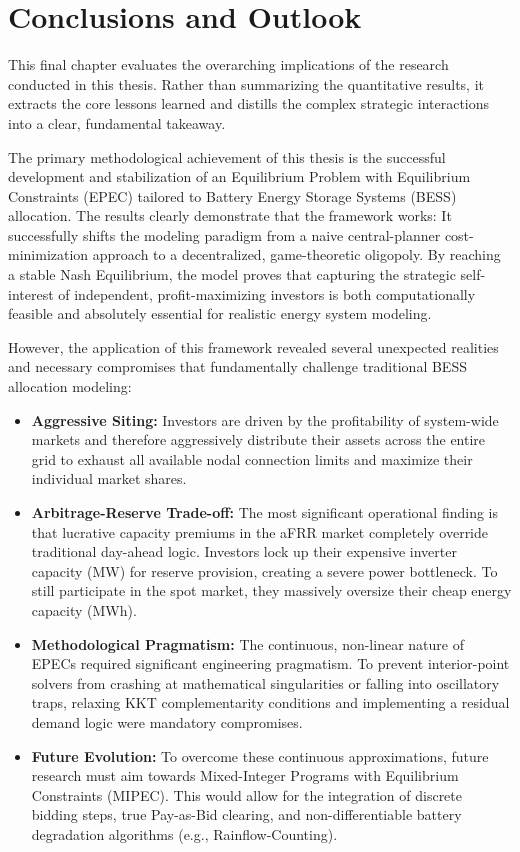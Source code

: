 \chapter{Conclusions and Outlook} \label{ch:conclusion}

This final chapter evaluates the overarching implications of the research conducted in this thesis. Rather than summarizing the quantitative results, it extracts the core lessons learned and distills the complex strategic interactions into a clear, fundamental takeaway.

The primary methodological achievement of this thesis is the successful development and stabilization of an Equilibrium Problem with Equilibrium Constraints (EPEC) tailored to Battery Energy Storage Systems (BESS) allocation. The results clearly demonstrate that the framework works: It successfully shifts the modeling paradigm from a naive central-planner cost-minimization approach to a decentralized, game-theoretic oligopoly. By reaching a stable Nash Equilibrium, the model proves that capturing the strategic self-interest of independent, profit-maximizing investors is both computationally feasible and absolutely essential for realistic energy system modeling.

However, the application of this framework revealed several unexpected realities and necessary compromises that fundamentally challenge traditional BESS allocation modeling:
\begin{itemize}
    \item \textbf{Aggressive Siting:} Investors are driven by the profitability of system-wide markets and therefore aggressively distribute their assets across the entire grid to exhaust all available nodal connection limits and maximize their individual market shares.
    \item \textbf{Arbitrage-Reserve Trade-off:} The most significant operational finding is that lucrative capacity premiums in the aFRR market completely override traditional day-ahead logic. Investors lock up their expensive inverter capacity (MW) for reserve provision, creating a severe power bottleneck. To still participate in the spot market, they massively oversize their cheap energy capacity (MWh).
    \item \textbf{Methodological Pragmatism:} The continuous, non-linear nature of EPECs required significant engineering pragmatism. To prevent interior-point solvers from crashing at mathematical singularities or falling into oscillatory traps, relaxing KKT complementarity conditions and implementing a residual demand logic were mandatory compromises.
    \item \textbf{Future Evolution:} To overcome these continuous approximations, future research must aim towards Mixed-Integer Programs with Equilibrium Constraints (MIPEC). This would allow for the integration of discrete bidding steps, true Pay-as-Bid clearing, and non-differentiable battery degradation algorithms (e.g., Rainflow-Counting).
\end{itemize}

